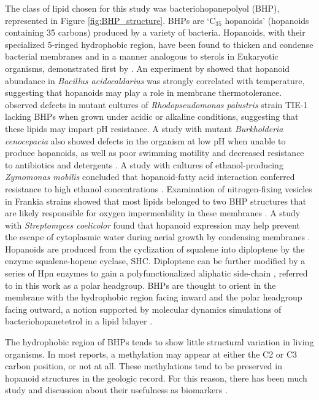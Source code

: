 The class of lipid chosen for this study was bacteriohopanepolyol (BHP), represented in Figure \ref{fig:BHP_structure}. BHPs are `C$_{35}$ hopanoids' (hopanoids containing 35 carbons) produced by a variety of bacteria. Hopanoids, with their specialized 5-ringed hydrophobic region, have been found to thicken and condense bacterial membranes and in a manner analogous to sterols in Eukaryotic organisms, demonstrated first by \cite{poralla1980glycolipid}. An experiment by \cite{poralla1984effect} showed that hopanoid abundance in \textit{Bacillus acidocaldarius} was strongly correlated with temperature, suggesting that hopanoids may play a role in membrane thermotolerance. \cite{welander2009hopanoids} observed defects in mutant cultures of \textit{Rhodopseudomonas palustris} strain TIE-1 lacking BHPs when grown under acidic or alkaline conditions, suggesting that these lipids may impart pH resistance. A study with mutant \textit{Burkholderia cenocepacia} also showed defects in the organism at low pH when unable to produce hopanoids, as well as poor swimming motility and decreased resistance to antibiotics and detergents \citep{schmerk2011hopanoid}. A study with cultures of ethanol-producing \textit{Zymomonas mobilis} concluded that hopanoid-fatty acid interaction conferred resistance to high ethanol concentrations \citep{bringer1985influence}. Examination of nitrogen-fixing vesicles in Frankia strains showed that most lipids belonged to two BHP structures that are likely responsible for oxygen impermeability in these membranes \citep{berry1993hopanoid}. A study with \textit{Streptomyces coelicolor} found that hopanoid expression may help prevent the escape of cytoplasmic water during aerial growth by condensing membranes \citep{poralla2000hopanoids}. Hopanoids are produced from the cyclization of squalene into diploptene by the enzyme squalene-hopene cyclase, SHC. Diploptene can be further modified by a series of Hpn enzymes to gain a polyfunctionalized aliphatic side-chain \citep{belin2018hopanoid, welander2012identification}, referred to in this work as a polar headgroup. BHPs are thought to orient in the membrane with the hydrophobic region facing inward and the polar headgroup facing outward, a notion supported by molecular dynamics simulations of bacteriohopanetetrol in a lipid bilayer \citep{poger2013relative}.

The hydrophobic region of BHPs tends to show little structural variation in living organisms. In most reports, a methylation may appear at either the C2 or C3 carbon position, or not at all. These methylations tend to be preserved in hopanoid structures in the geologic record. For this reason, there has been much study and discussion about their usefulness as biomarkers \citep[see review by][]{newman2016cellular}.

